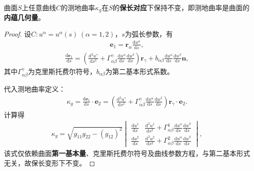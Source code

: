 \documentclass[../../main.tex]{subfiles}%
\begin{document}
\begin{theorem}
曲面$S$上任意曲线$C$的测地曲率$\kappa_g$在$S$的\textbf{保长对应}下保持不变，即测地曲率是曲面的\textbf{内蕴几何量}。
\end{theorem}
\begin{proof}

设$C:u^\alpha=u^\alpha(s)\ (\alpha=1,2)$，$s$为弧长参数，有
\begin{align*}
\boldsymbol{e}_1=\boldsymbol{r}_\alpha\frac{\mathrm{d}u^\alpha}{\mathrm{d}s},
\end{align*}
\begin{align}
\frac{\mathrm{d}\boldsymbol{e}_1}{\mathrm{d}s}=\left(\frac{\mathrm{d}^2u^\gamma}{\mathrm{d}s^2}+\Gamma_{\alpha\beta}^\gamma\frac{\mathrm{d}u^\alpha}{\mathrm{d}s}\frac{\mathrm{d}u^\beta}{\mathrm{d}s}\right)\boldsymbol{r}_\gamma+b_{\alpha\beta}\frac{\mathrm{d}u^\alpha}{\mathrm{d}s}\frac{\mathrm{d}u^\beta}{\mathrm{d}s}\boldsymbol{n},\label{eq:de1ds}
\end{align}
其中$\Gamma_{\alpha\beta}^\gamma$为克里斯托费尔符号，$b_{\alpha\beta}$为第二基本形式系数。

代入测地曲率定义：
\begin{align*}
\kappa_g=\frac{\mathrm{d}\boldsymbol{e}_1}{\mathrm{d}s}\cdot\boldsymbol{e}_2=\left(\frac{\mathrm{d}^2u^\gamma}{\mathrm{d}s^2}+\Gamma_{\alpha\beta}^\gamma\frac{\mathrm{d}u^\alpha}{\mathrm{d}s}\frac{\mathrm{d}u^\beta}{\mathrm{d}s}\right)\boldsymbol{r}_\gamma\cdot\boldsymbol{e}_2.
\end{align*}
计算得
\begin{align}
\kappa_g=\sqrt{g_{11}g_{22}-(g_{12})^2}
\begin{vmatrix}
\frac{\mathrm{d}u^1}{\mathrm{d}s}&\frac{\mathrm{d}^2u^1}{\mathrm{d}s^2}+\Gamma_{\alpha\beta}^1\frac{\mathrm{d}u^\alpha}{\mathrm{d}s}\frac{\mathrm{d}u^\beta}{\mathrm{d}s}\\
\frac{\mathrm{d}u^2}{\mathrm{d}s}&\frac{\mathrm{d}^2u^2}{\mathrm{d}s^2}+\Gamma_{\alpha\beta}^2\frac{\mathrm{d}u^\alpha}{\mathrm{d}s}\frac{\mathrm{d}u^\beta}{\mathrm{d}s}
\end{vmatrix},\label{eq:kgintrinsic}
\end{align}
该式仅依赖曲面\textbf{第一基本量}、克里斯托费尔符号及曲线参数方程，与第二基本形式无关，故保长变形下不变。

\end{proof}
\end{document}
